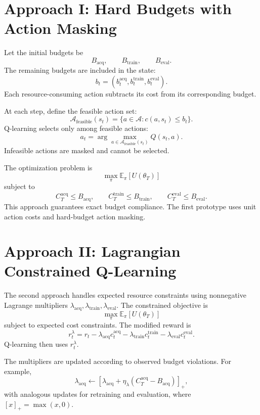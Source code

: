 \documentclass[11pt,letterpaper]{article}
\begin{document}
\section{Approach I: Hard Budgets with Action Masking}

Let the initial budgets be
\[
    B_{\mathrm{acq}},\qquad B_{\mathrm{train}},\qquad B_{\mathrm{eval}}.
\]
The remaining budgets are included in the state:
\[
    b_t
    =
    \left(
        b_t^{\mathrm{acq}},
        b_t^{\mathrm{train}},
        b_t^{\mathrm{eval}}
    \right).
\]
Each resource-consuming action subtracts its cost from its corresponding
budget.

At each step, define the feasible action set:
\[
    \mathcal{A}_{\mathrm{feasible}}(s_t)
    =
    \{a\in\mathcal{A}:c(a,s_t)\leq b_t\}.
\]
Q-learning selects only among feasible actions:
\[
    a_t
    =
    \arg\max_{a\in\mathcal{A}_{\mathrm{feasible}}(s_t)}
    Q(s_t,a).
\]
Infeasible actions are masked and cannot be selected.

The optimization problem is
\[
    \max_\pi \mathbb{E}_\pi[U(\theta_T)]
\]
subject to
\[
    C_T^{\mathrm{acq}}\leq B_{\mathrm{acq}},
    \qquad
    C_T^{\mathrm{train}}\leq B_{\mathrm{train}},
    \qquad
    C_T^{\mathrm{eval}}\leq B_{\mathrm{eval}}.
\]
This approach guarantees exact budget compliance. The first prototype uses
unit action costs and hard-budget action masking.

\section{Approach II: Lagrangian Constrained Q-Learning}

The second approach handles expected resource constraints using nonnegative
Lagrange multipliers
\(\lambda_{\mathrm{acq}},\lambda_{\mathrm{train}},\lambda_{\mathrm{eval}}\).
The constrained objective is
\[
    \max_\pi\mathbb{E}_\pi[U(\theta_T)]
\]
subject to expected cost constraints. The modified reward is
\[
    r_t^\lambda
    =
    r_t
    -
    \lambda_{\mathrm{acq}}c_t^{\mathrm{acq}}
    -
    \lambda_{\mathrm{train}}c_t^{\mathrm{train}}
    -
    \lambda_{\mathrm{eval}}c_t^{\mathrm{eval}}.
\]
Q-learning then uses \(r_t^\lambda\).

The multipliers are updated according to observed budget violations. For
example,
\[
    \lambda_{\mathrm{acq}}
    \leftarrow
    \left[
        \lambda_{\mathrm{acq}}
        +
        \eta_\lambda
        \left(C_T^{\mathrm{acq}}-B_{\mathrm{acq}}\right)
    \right]_+,
\]
with analogous updates for retraining and evaluation, where
\([x]_+=\max(x,0)\).
\end{document}
